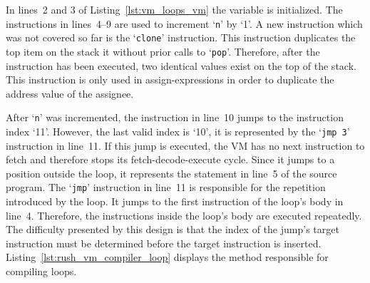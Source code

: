\noindent
\begin{figure}[h]
	\begin{minipage}{.44\textwidth}
		\centering
	\end{minipage}%
	\hfill
	\begin{minipage}{.44\textwidth}
		\centering
	\end{minipage}
	\vspace{.1cm}
\end{figure}

In lines~2 and 3 of Listing~\ref{lst:vm_loops_vm} the variable  is initialized.
The instructions in lines~4--9 are used to increment `\texttt{n}' by `1'.
A new instruction which was not covered so far is the `\texttt{clone}' instruction.
This instruction duplicates the top item on the stack it without prior calls to `\texttt{pop}'.
Therefore, after the instruction has been executed, two identical values exist on the top of the stack.
This instruction is only used in assign-expressions in order to duplicate the address value of the assignee.

After `\texttt{n}' was incremented, the instruction in line~10 jumps to the instruction index `11'.
However, the last valid index is `10', it is represented by the `\texttt{jmp 3}' instruction in line~11.
If this jump is executed, the VM has no next instruction to fetch and therefore stops its fetch-decode-execute cycle.
Since it jumps to a position outside the loop, it represents the  statement in line~5 of the source program.
The `\texttt{jmp}' instruction in line~11 is responsible for the repetition introduced by the loop.
It jumps to the first instruction of the loop's body in line~4.
Therefore, the instructions inside the loop's body are executed repeatedly.
The difficulty presented by this design is that the index of the jump's target instruction must be determined before the target instruction is inserted.
Listing~\ref{lst:rush_vm_compiler_loop} displays the method responsible for compiling loops.


